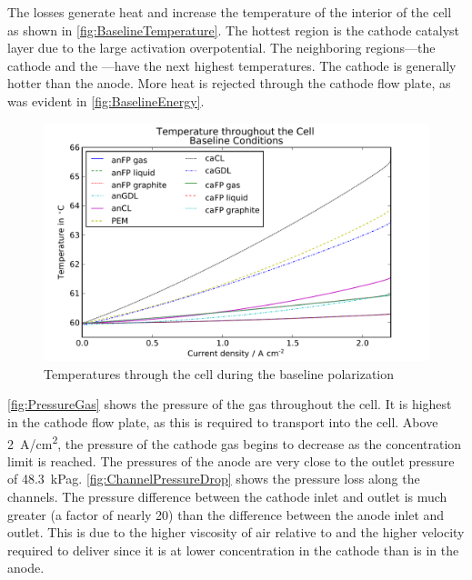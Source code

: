 The losses generate heat and increase the temperature of the interior of the cell as shown in \autoref{fig:BaselineTemperature}.  The hottest region is the cathode catalyst layer due to the large activation overpotential.  The neighboring regions---the cathode  and the ---have the next highest temperatures.  The cathode is generally hotter than the anode.  More heat is rejected through the cathode flow plate, as was evident in \autoref{fig:BaselineEnergy}.

\begin{figure}[htbp]
  \includegraphics[width=\linewidth]{Results/Cell/Model/1/Temperature}%
  \caption{Temperatures through the cell during the baseline polarization}%
  \label{fig:BaselineTemperature}
\end{figure}

\autoref{fig:PressureGas} shows the pressure of the gas throughout the cell.  It is highest in the cathode flow plate, as this is required to transport  into the cell.  Above \SI{2}{A/cm^2}, the pressure of the cathode gas begins to decrease as the concentration limit is reached.  The pressures of the anode are very close to the outlet pressure of \SI{48.3}{kPag}.   \autoref{fig:ChannelPressureDrop} shows the pressure loss along the channels.  The pressure difference between the cathode inlet and outlet is much greater (a factor of nearly 20) than the difference between the anode inlet and outlet.  This is due to the higher viscosity of air relative to  and the higher velocity required to deliver  since it is at lower concentration in the cathode than  is in the anode.

